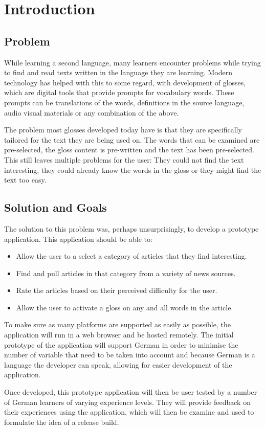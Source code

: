 \chapter{Introduction}

\section{Problem}
While learning a second language, many learners encounter problems while trying to find and read texts written in the language they are learning. Modern technology has helped with this to some regard, with development of glosses, which are digital tools that provide prompts for vocabulary words. These prompts can be translations of the words, definitions in the source language, audio visual materials or any combination of the above. 

The problem most glosses developed today have is that they are specifically tailored for the text they are being used on. The words that can be examined are pre-selected, the gloss content is pre-written and the text has been pre-selected. This still leaves multiple problems for the user: They could not find the text interesting, they could already know the words in the gloss or they might find the text too easy. 

\section{Solution and Goals}

The solution to this problem was, perhaps unsurprisingly, to develop a prototype application. This application should be able to:

\begin{itemize}
	\item Allow the user to a select a category of articles that they find interesting.
	
	\item Find and pull articles in that category from a variety of news sources.
	
	\item Rate the articles based on their perceived difficulty for the user.
	
	\item Allow the user to activate a gloss on any and all words in the article. 
\end{itemize}

To make sure as many platforms are supported as easily as possible, the application will run in a web browser and be hosted remotely. The initial prototype of the application will support German in order to minimise the number of variable that need to be taken into account and because German is a language the developer can speak, allowing for easier development of the application.

Once developed, this  prototype application will then be user tested by a number of German learners of varying experience levels. They will provide feedback on their experiences using the application, which will then be examine and used to formulate the idea of a release build. 
